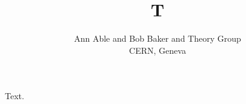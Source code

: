 \documentclass{article}
\begin{document}
\title{T}
\author{Ann Able and Bob Baker and Theory Group \\ CERN, Geneva}
\maketitle
Text.
\end{document}
